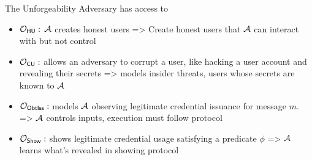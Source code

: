 The Unforgeability Adversary has access to 
\begin{itemize}
    \item $\mathcal{O}_{\mathsf{HU}}:$ $\mathcal{A}$ creates honest users => Create honest users that $\mathcal{A}$ can interact with but not control
    \item $\mathcal{O}_{\mathsf{CU}}:$ allows an adversary to corrupt a user, like hacking a user account and revealing their secrets => models insider threats, users whose secrets are known to $\mathcal{A}$
    \item $\mathcal{O}_{\mathsf{ObtIss}}:$ models $\mathcal{A}$ observing legitimate credential issuance for message $m$. => $\mathcal{A}$ controls inputs, execution must follow protocol
    \item $\mathcal{O}_{\mathsf{Show}}:$ shows legitimate credential usage satisfying a predicate $\phi$ => $\mathcal{A}$ learns what's revealed in showing protocol
\end{itemize}


